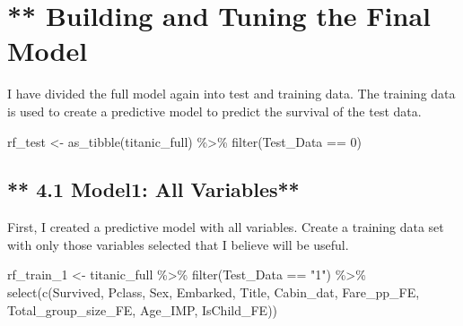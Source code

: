 \documentclass[
]{article}
\newenvironment{Shaded}{\begin{snugshade}}{\end{snugshade}}
\newcommand{\DecValTok}[1]{\textcolor[rgb]{0.00,0.00,0.81}{#1}}
\newcommand{\FunctionTok}[1]{\textcolor[rgb]{0.00,0.00,0.00}{#1}}
\newcommand{\NormalTok}[1]{#1}
\newcommand{\OtherTok}[1]{\textcolor[rgb]{0.56,0.35,0.01}{#1}}
\newcommand{\SpecialCharTok}[1]{\textcolor[rgb]{0.00,0.00,0.00}{#1}}
\newcommand{\StringTok}[1]{\textcolor[rgb]{0.31,0.60,0.02}{#1}}
\begin{document}
\hypertarget{building-and-tuning-the-final-model}{%
\section{** Building and Tuning the Final
Model}\label{building-and-tuning-the-final-model}}

I have divided the full model again into test and training data. The
training data is used to create a predictive model to predict the
survival of the test data.

\begin{Shaded}
\begin{Highlighting}[]
\NormalTok{rf\_test }\OtherTok{\textless{}{-}} \FunctionTok{as\_tibble}\NormalTok{(titanic\_full) }\SpecialCharTok{\%\textgreater{}\%}
  \FunctionTok{filter}\NormalTok{(Test\_Data }\SpecialCharTok{==} \DecValTok{0}\NormalTok{)}
\end{Highlighting}
\end{Shaded}

\hypertarget{model1-all-variables}{%
\subsection{** 4.1 Model1: All Variables**}\label{model1-all-variables}}

First, I created a predictive model with all variables. Create a
training data set with only those variables selected that I believe will
be useful.

\begin{Shaded}
\begin{Highlighting}[]
\NormalTok{rf\_train\_1 }\OtherTok{\textless{}{-}}\NormalTok{ titanic\_full }\SpecialCharTok{\%\textgreater{}\%}
  \FunctionTok{filter}\NormalTok{(Test\_Data }\SpecialCharTok{==} \StringTok{"1"}\NormalTok{) }\SpecialCharTok{\%\textgreater{}\%}
  \FunctionTok{select}\NormalTok{(}\FunctionTok{c}\NormalTok{(Survived, Pclass, Sex, Embarked, Title, Cabin\_dat, Fare\_pp\_FE, Total\_group\_size\_FE, Age\_IMP, IsChild\_FE))}
\end{Highlighting}
\end{Shaded}
\end{document}

